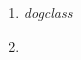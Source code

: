\documentclass[../main.tex]{subfiles}
\begin{document}
    \begin{enumerate}
        \item \emph{dogclass}
        \item 

    \end{enumerate}
\end{document}
